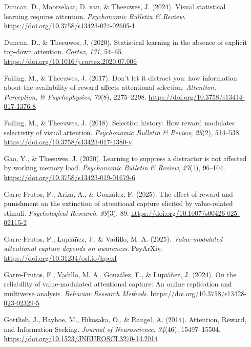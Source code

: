 \documentclass[
  man,
  floatsintext,
  longtable,
  nolmodern,
  notxfonts,
  notimes,
  colorlinks=true,linkcolor=blue,citecolor=blue,urlcolor=blue]{apa7}
\newlength{\cslhangindent}
\newenvironment{CSLReferences}[2] %
 {\begin{list}{}{%
  \setlength{\itemindent}{0pt}
  \setlength{\leftmargin}{0pt}
  \setlength{\parsep}{0pt}
  \ifodd #1
   \setlength{\leftmargin}{\cslhangindent}
   \setlength{\itemindent}{-1\cslhangindent}
  \fi
  \setlength{\itemsep}{#2\baselineskip}}}
 {\end{list}}
\begin{document}
\begin{CSLReferences}{1}{0}
Duncan, D., Moorselaar, D. van, \& Theeuwes, J. (2024). Visual
statistical learning requires attention. \emph{Psychonomic Bulletin \&
Review}. \url{https://doi.org/10.3758/s13423-024-02605-1}

Duncan, D., \& Theeuwes, J. (2020). Statistical learning in the absence
of explicit top-down attention. \emph{Cortex}, \emph{131}, 54--65.
\url{https://doi.org/10.1016/j.cortex.2020.07.006}

Failing, M., \& Theeuwes, J. (2017). Don{'}t let it distract you: how
information about the availability of reward affects attentional
selection. \emph{Attention, Perception, \& Psychophysics}, \emph{79}(8),
2275--2298. \url{https://doi.org/10.3758/s13414-017-1376-8}

Failing, M., \& Theeuwes, J. (2018). Selection history: How reward
modulates selectivity of visual attention. \emph{Psychonomic Bulletin \&
Review}, \emph{25}(2), 514--538.
\url{https://doi.org/10.3758/s13423-017-1380-y}

Gao, Y., \& Theeuwes, J. (2020). Learning to suppress a distractor is
not affected by working memory load. \emph{Psychonomic Bulletin \&
Review}, \emph{27}(1), 96--104.
\url{https://doi.org/10.3758/s13423-019-01679-6}

Garre-Frutos, F., Ariza, A., \& González, F. (2025). The effect of
reward and punishment on the extinction of attentional capture elicited
by value-related stimuli. \emph{Psychological Research}, \emph{89}(3),
89. \url{https://doi.org/10.1007/s00426-025-02115-2}

Garre-Frutos, F., Lupiáñez, J., \& Vadillo, M. A. (2025).
\emph{Value-modulated attentional capture depends on awareness}.
PsyArXiv. \url{https://doi.org/10.31234/osf.io/hpexf}

Garre-Frutos, F., Vadillo, M. A., González, F., \& Lupiáñez, J. (2024).
On the reliability of value-modulated attentional capture: An online
replication and multiverse analysis. \emph{Behavior Research Methods}.
\url{https://doi.org/10.3758/s13428-023-02329-5}

Gottlieb, J., Hayhoe, M., Hikosaka, O., \& Rangel, A. (2014). Attention,
Reward, and Information Seeking. \emph{Journal of Neuroscience},
\emph{34}(46), 15497--15504.
\url{https://doi.org/10.1523/JNEUROSCI.3270-14.2014}


\end{CSLReferences}
\end{document}
